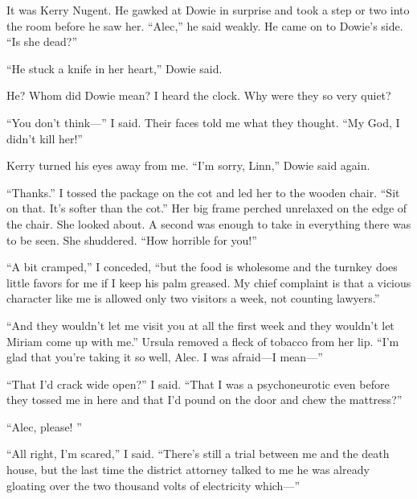\documentclass{novel}
\begin{document}
It was Kerry Nugent. He gawked at Dowie in surprise and took a step or two into the room before he saw her. “Alec,” he said weakly. He came on to Dowie’s side. “Is she dead?”

“He stuck a knife in her heart,” Dowie said.

He? Whom did Dowie mean? I heard the clock. Why were they so very quiet?

“You don’t think—” I said. Their faces told me what they thought. “My God, I didn’t kill her!”

Kerry turned his eyes away from me. “I’m sorry, Linn,” Dowie said again.

\vspace{2\nbs}
\clearpage
\thispagestyle{empty}


\begin{ChapterStart}
\vspace{3\nbs}
\end{ChapterStart}

“Thanks.” I tossed the package on the cot and led her to the wooden chair. “Sit on that. It’s softer than the cot.” Her big frame perched unrelaxed on the edge of the chair. She looked about. A second was enough to take in everything there was to be seen. She shuddered. “How horrible for you!”

“A bit cramped,” I conceded, “but the food is wholesome and the turnkey does little favors for me if I keep his palm greased. My chief complaint is that a vicious character like me is allowed only two visitors a week, not counting lawyers.”

“And they wouldn’t let me visit you at all the first week and they wouldn’t let Miriam come up with me.” Ursula removed a fleck of tobacco from her lip. “I’m glad that you’re taking it so well, Alec. I was afraid—I mean—”

“That I’d crack wide open?” I said. “That I was a psychoneurotic even before they tossed me in here and that I’d pound on the door and chew the mattress?”

“Alec, please! ”

“All right, I’m scared,” I said. “There’s still a trial between me and the death house, but the last time the district attorney talked to me he was already gloating over the two thousand volts of electricity which—”
\end{document}
